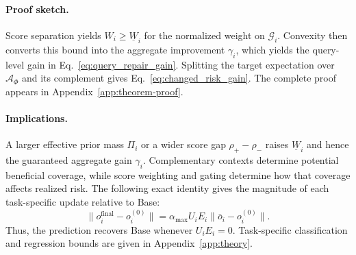 \paragraph{Proof sketch.}
Score separation yields $W_i\geq\underline W_i$ for the normalized weight on
$\mathcal G_i$. Convexity then converts this bound into the aggregate
improvement $\gamma_i$, which yields the query-level gain in
Eq.~\eqref{eq:query_repair_gain}. Splitting the target expectation over
$\mathcal A_\Phi$ and its complement gives
Eq.~\eqref{eq:changed_risk_gain}. The complete proof appears in
Appendix~\ref{app:theorem-proof}.

\paragraph{Implications.}
A larger effective prior mass $\Pi_i$ or a wider score gap
$\rho_+-\rho_-$ raises $\underline W_i$ and hence the guaranteed aggregate
gain $\gamma_i$. Complementary contexts determine potential beneficial coverage,
while score weighting and gating determine how that coverage affects realized
risk. The following exact identity gives the magnitude of each task-specific
update relative to Base:
\begin{equation}
  \lVert o_i^{\mathrm{final}}-o_i^{(0)}\rVert
  =\alpha_{\max}U_iE_i
   \lVert\bar o_i-o_i^{(0)}\rVert.
  \label{eq:base_preservation_identity}
\end{equation}
Thus, the prediction recovers Base whenever $U_iE_i=0$. Task-specific
classification and regression bounds are given in Appendix~\ref{app:theory}.
